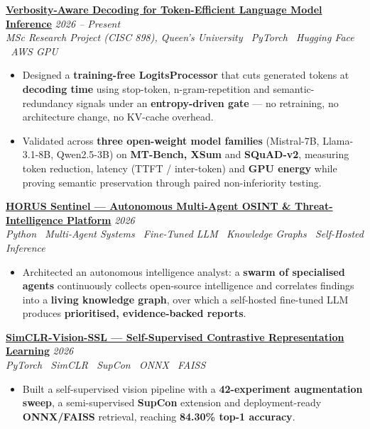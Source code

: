 \documentclass[10pt, a4paper]{article}
\newcommand{\cvproject}[3]{%
  \vspace{2.5pt}%
  {\bfseries\color{navy}#1} \hfill {\color{midgray}\textit{#3}}\\[-1.5pt]%
  {\color{teal}\textit{#2}}%
}
\newenvironment{cvitems}{%
  \begin{itemize}[leftmargin=11pt, itemsep=0.5pt, parsep=0pt, topsep=1pt,
                  label={\textcolor{teal}{$\bullet$}}]
}{%
  \end{itemize}%
}
\begin{document}
\cvproject{\href{https://github.com/MahmoudAlyosify/minimal-lm}{Verbosity-Aware Decoding for Token-Efficient Language Model Inference}}
          {MSc Research Project (CISC 898), Queen's University \textperiodcentered\ PyTorch \textperiodcentered\ Hugging Face \textperiodcentered\ AWS GPU}
          {2026 -- Present}
\begin{cvitems}
  \item Designed a \textbf{training-free LogitsProcessor} that cuts generated tokens at \textbf{decoding time} using stop-token, n-gram-repetition and semantic-redundancy signals under an \textbf{entropy-driven gate} --- no retraining, no architecture change, no KV-cache overhead.
  \item Validated across \textbf{three open-weight model families} (Mistral-7B, Llama-3.1-8B, Qwen2.5-3B) on \textbf{MT-Bench, XSum} and \textbf{SQuAD-v2}, measuring token reduction, latency (TTFT / inter-token) and \textbf{GPU energy} while proving semantic preservation through paired non-inferiority testing.
\end{cvitems}

\cvproject{\href{https://github.com/MahmoudAlyosify/horus-sentinel}{HORUS Sentinel --- Autonomous Multi-Agent OSINT \& Threat-Intelligence Platform}}
          {Python \textperiodcentered\ Multi-Agent Systems \textperiodcentered\ Fine-Tuned LLM \textperiodcentered\ Knowledge Graphs \textperiodcentered\ Self-Hosted Inference}
          {2026}
\begin{cvitems}
  \item Architected an autonomous intelligence analyst: a \textbf{swarm of specialised agents} continuously collects open-source intelligence and correlates findings into a \textbf{living knowledge graph}, over which a self-hosted fine-tuned LLM produces \textbf{prioritised, evidence-backed reports}.
\end{cvitems}

\cvproject{\href{https://github.com/MahmoudAlyosify/SimCLR-Vision-SSL}{SimCLR-Vision-SSL --- Self-Supervised Contrastive Representation Learning}}
          {PyTorch \textperiodcentered\ SimCLR \textperiodcentered\ SupCon \textperiodcentered\ ONNX \textperiodcentered\ FAISS}
          {2026}
\begin{cvitems}
  \item Built a self-supervised vision pipeline with a \textbf{42-experiment augmentation sweep}, a semi-supervised \textbf{SupCon} extension and deployment-ready \textbf{ONNX/FAISS} retrieval, reaching \textbf{84.30\% top-1 accuracy}.
\end{cvitems}
\end{document}
